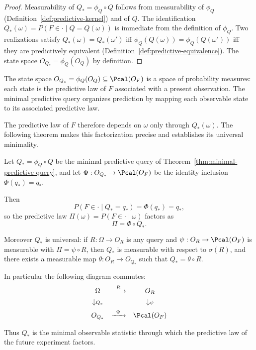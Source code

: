 \begin{proof}
Measurability of $Q_*=\phi_Q\circ Q$ follows from measurability of
$\phi_Q$ (Definition~\ref{def:predictive-kernel}) and of $Q$.  The
identification $Q_*(\omega)=P(F\in\cdot\mid Q=Q(\omega))$ is immediate
from the definition of $\phi_Q$.  Two realizations satisfy
$Q_*(\omega)=Q_*(\omega')$ iff $\phi_Q(Q(\omega))=\phi_Q(Q(\omega'))$
iff they are predictively equivalent
(Definition~\ref{def:predictive-equivalence}).  The state space
$O_{Q_*}=\phi_Q(O_Q)$ by definition.
\end{proof}

\begin{remark}
The state space $O_{Q_*}=\phi_Q(O_Q)\subseteq\Pcal(O_F)$ is a space
of probability measures: each state is the predictive law of $F$
associated with a present observation.  The minimal predictive query
organizes prediction by mapping each observable state to its
associated predictive law.
\end{remark}

The predictive law of $F$ therefore depends on $\omega$ only through
$Q_*(\omega)$.  The following theorem makes this factorization precise
and establishes its universal minimality.

\begin{theorem}\label{thm:predictive-factorization}
Let $Q_*=\phi_Q\circ Q$ be the minimal predictive query of
Theorem~\ref{thm:minimal-predictive-query}, and let
$\Phi:O_{Q_*}\to\Pcal(O_F)$ be the identity inclusion
$\Phi(q_*)=q_*$.

Then
\[
P(F\in\cdot\mid Q_*=q_*)=\Phi(q_*)=q_*,
\]
so the predictive law $\Pi(\omega)=P(F\in\cdot\mid\omega)$ factors as
\[
\Pi = \Phi\circ Q_*.
\]

Moreover $Q_*$ is universal: if $R:\Omega\to O_R$ is any query and
$\psi:O_R\to\Pcal(O_F)$ is measurable with $\Pi=\psi\circ R$, then
$Q_*$ is measurable with respect to $\sigma(R)$, and there exists a
measurable map $\theta:O_R\to O_{Q_*}$ such that $Q_*=\theta\circ R$.

In particular the following diagram commutes:
\[
\begin{array}{ccc}
\Omega & \xrightarrow{\;\;R\;\;} & O_R \\[4pt]
\downarrow\scriptstyle{Q_*} & & \downarrow\scriptstyle{\psi} \\[4pt]
O_{Q_*} & \xrightarrow{\;\;\Phi\;\;} & \Pcal(O_F)
\end{array}
\]

Thus $Q_*$ is the minimal observable statistic through which the
predictive law of the future experiment factors.
\end{theorem}


